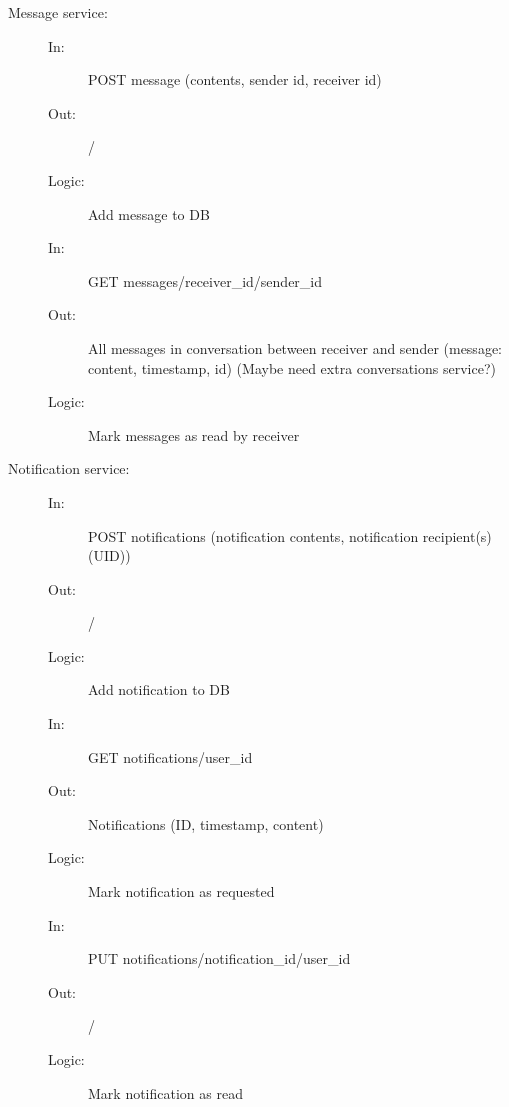 \documentclass{article}
\begin{document}
\begin{description}
    \item [Message service:] 
    \begin{description}
        \item[]
        \item[In:] POST message (contents, sender id, receiver id)
        \item[Out:] /
        \item[Logic:] Add message to DB
        \item[]
        
        \item[In:] GET messages/receiver\_id/sender\_id
        \item[Out:] All messages in conversation between receiver and sender (message: content, timestamp, id) (Maybe need extra conversations service?)
        \item[Logic:] Mark messages as read by receiver
    \end{description}
\end{description}

\begin{description}
    \item [Notification service:] 
    \begin{description}
        \item[]
        \item[In:] POST notifications (notification contents, notification recipient(s) (UID))
        \item[Out:] /
        \item[Logic:] Add notification to DB
        \item[]
        
        \item[In:] GET notifications/user\_id 
        \item[Out:] Notifications (ID, timestamp, content)
        \item[Logic:] Mark notification as requested
        \item[]
        
        \item[In:] PUT notifications/notification\_id/user\_id
        \item[Out:] /
        \item[Logic: ] Mark notification as read
    \end{description}
\end{description}
\end{document}
